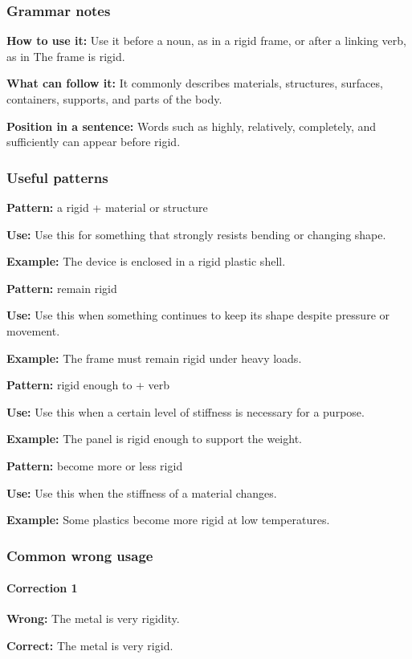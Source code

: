 \documentclass[11pt]{article}
\begin{document}
\subsubsection{Grammar notes}
\textbf{How to use it:} Use it before a noun, as in a rigid frame, or after a linking verb, as in The frame is rigid.

\textbf{What can follow it:} It commonly describes materials, structures, surfaces, containers, supports, and parts of the body.

\textbf{Position in a sentence:} Words such as highly, relatively, completely, and sufficiently can appear before rigid.

\subsubsection{Useful patterns}
\textbf{Pattern:} a rigid + material or structure

\textbf{Use:} Use this for something that strongly resists bending or changing shape.

\textbf{Example:} The device is enclosed in a rigid plastic shell.

\textbf{Pattern:} remain rigid

\textbf{Use:} Use this when something continues to keep its shape despite pressure or movement.

\textbf{Example:} The frame must remain rigid under heavy loads.

\textbf{Pattern:} rigid enough to + verb

\textbf{Use:} Use this when a certain level of stiffness is necessary for a purpose.

\textbf{Example:} The panel is rigid enough to support the weight.

\textbf{Pattern:} become more or less rigid

\textbf{Use:} Use this when the stiffness of a material changes.

\textbf{Example:} Some plastics become more rigid at low temperatures.

\subsubsection{Common wrong usage}
\paragraph{Correction 1}
\textbf{Wrong:} The metal is very rigidity.

\textbf{Correct:} The metal is very rigid.
\end{document}
